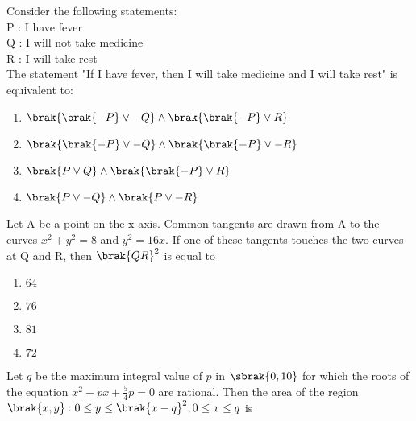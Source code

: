 \iffalse
\title{Assignment}
\author{K.AKSHAY TEJA}
\section{mcq-single}
\fi
\item Consider the following statements:\\
P : I have fever\\
Q : I will not take medicine\\
R : I will take rest\\
The statement "If I have fever, then I will take
medicine and I will take rest" is equivalent to:  \hfill {}

\begin{multicols}{2}
\begin{enumerate}
    \item $\brak{\brak{- P} \lor - Q} \land \brak{\brak{- P} \lor R}$
    \item $\brak{\brak{- P} \lor - Q} \land \brak{\brak{- P} \lor - R}$
    \item $\brak{P \lor Q} \land \brak{\brak{- P} \lor R}$
    \item $\brak{P \lor - Q} \land \brak{P \lor - R}$
\end{enumerate}
\end{multicols}

\item Let A be a point on the x-axis. Common tangents are drawn from A to the curves $x^2 + y^2 = 8$ and $y^2 = 16x$. If one of these tangents touches the two curves at Q and R, then $\brak{QR}^2$ is equal to   \hfill {}

\begin{multicols}{4}    
\begin{enumerate}
    \item $64$
    \item $76$
    \item $81$
    \item $72$
\end{enumerate}
\end{multicols}


\item Let $q$ be the maximum integral value of $p$ in $\sbrak{0, 10}$ for which the roots of the equation $x^2 - px + \frac{5}{4}p = 0$ are rational. Then the area of the region $\brak{x, y} : 0 \leq y \leq \brak{x - q}^2, 0 \leq x \leq q$ is   \hfill {}

